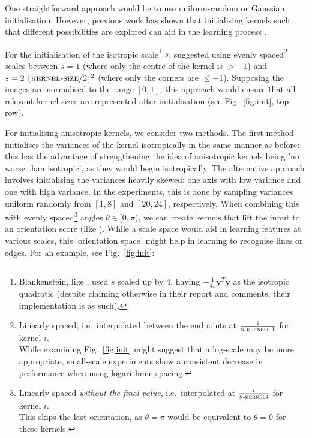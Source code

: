 \documentclass[a4paper, 12pt]{report}
\begin{document}
One straightforward approach would be to use uniform-random or Gaussian initialisation. However, previous work has shown that initialising kernels such that different possibilities are explored can aid in the learning process \cite{thierrybsc}.

For the initialisation of the isotropic scale\footnote{Blankenstein, like \cite{groenendijk2022morphpool}, used $s$ scaled up by 4, having $-\frac{1}{4s}\mathbf{y}^T\mathbf{y}$ as the isotropic quadratic (despite claiming otherwise in their report and comments, their implementation is as such). } $s$, \cite{thierrybsc} suggested using evenly spaced\footnote{Linearly spaced, i.e.\ interpolated between the endpoints at $\frac{i}{\textsc{n-kernels-1}}$ for kernel $i$.\\While examining Fig.\ \ref{fig:init} might suggest that a log-scale may be more appropriate, small-scale experiments show a consistent decrease in performance when using logarithmic spacing.  } scales between $s=1$ (where only the centre of the kernel is $>-1$) and $s=2~\lfloor\textsc{kernel-size}/2\rfloor^2$ (where only the corners are $\leq-1$). Supposing the images are normalised to the range $[0, 1]$, this approach would ensure that all relevant kernel sizes are represented after initialisation (see Fig.\ \ref{fig:init}, top row).

For initialising anisotropic kernels, we consider two methods. The first method initialises the variances of the kernel isotropically in the same manner as before: this has the advantage of strengthening the idea of anisotropic kernels being 'no worse than isotropic', as they would begin isotropically. The alternative approach involves initialising the variances heavily skewed: one axis with low variance and one with high variance. In the experiments, this is done by sampling variances uniform randomly from $[1, 8]$ and $[20, 24]$, respectively. When combining this with evenly spaced\footnote{Linearly spaced \textit{without the final value}, i.e.\ interpolated at $\frac{i}{\textsc{n-kernels}}$ for kernel $i$.
\\
This skips the last orientation, as $\theta=\pi$ would be equivalent to $\theta=0$ for these kernels. \vspace{-0.25cm}
} angles $\theta\in[0, \pi)$, we can create kernels that lift the input to an orientation score (like \cite{smetspde}). While a scale space would aid in learning features at various scales, this 'orientation space' might help in learning to recognise lines or edges. For an example, see Fig.\ \ref{fig:init}:
\end{document}
